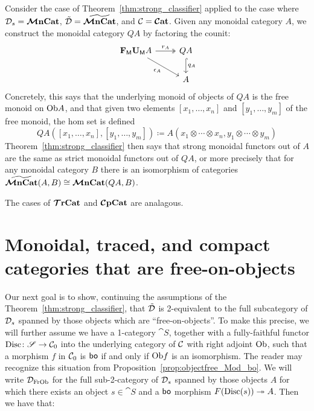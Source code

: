 \documentclass[11pt,oneside,article]{memoir}
\begin{document}
\begin{example}
   Consider the case of Theorem~\ref{thm:strong_classifier} applied to the case where
   $\mathcal{D}_s=\bm{\mathcal{M}}\mathbf{nCat}$, $\tilde{\mathcal{D}}=\widetilde{\bm{\mathcal{M}}\mathbf{nCat}}$, and $\mathcal{C}=\bm{\mathcal{C}}\mathbf{at}$. Given any monoidal category
   $A$, we construct the monoidal category $QA$ by factoring the counit:
   \begin{equation}
      \begin{tikzcd}
         \FM\UM A \ar[r,two heads,"r_A"] \ar[dr,"\epsilon_A"']
            & QA \ar[d,hook,"q_A"] \\
         & A
      \end{tikzcd}
   \end{equation}
   Concretely, this says that the underlying monoid of objects of $QA$ is the free monoid on
   $\mathrm{Ob} A$, and that given two elements $[x_1,\dots,x_n]$ and $[y_1,\dots,y_m]$ of the free monoid,
   the hom set is defined
   \begin{equation*}
      QA([x_1,\dots,x_n],[y_1,\dots,y_m])
         \coloneqq A(x_1\otimes\cdots\otimes x_n,y_1\otimes\cdots\otimes y_m)
   \end{equation*}
   Theorem~\ref{thm:strong_classifier} then says that strong monoidal functors out of $A$ are the
   same as strict monoidal functors out of $QA$, or more precisely that for any monoidal category
   $B$ there is an isomorphism of categories $\widetilde{\bm{\mathcal{M}}\mathbf{nCat}}(A,B)\cong\bm{\mathcal{M}}\mathbf{nCat}(QA,B)$.
   
   The cases of $\bm{\mathcal{T}}\mathbf{rCat}$ and $\bm{\mathcal{C}}\mathbf{pCat}$ are analagous.
\end{example}

\section{Monoidal, traced, and compact categories that are free-on-objects}

Our next goal is to show, continuing the assumptions of the Theorem~\ref{thm:strong_classifier}, that $\tilde{\mathcal{D}}$ is
2-equivalent to the full subcategory of $\mathcal{D}_s$ spanned by those objects which are
``free-on-objects''. To make this precise, we will further assume we have a 1-category $\cat{S}$,
together with a fully-faithful functor $\mathrm{Disc}\colon\mathscr{S}\to\mathcal{C}_0$ into the underlying
category of $\mathcal{C}$ with right adjoint $\mathrm{Ob}$, such that a morphism $f$ in $\mathcal{C}_0$ is $\mathsf{bo}$ if
and only if $\mathrm{Ob} f$ is an isomorphism. The reader may recognize this situation from Proposition~\ref{prop:objectfree_Mod_bo}. We will write $\mathcal{D}_{\mathrm{FrOb}}$ for the full sub-2-category of
$\mathcal{D}_s$ spanned by those objects $A$ for which there exists an object $s\in\cat{S}$ and a $\mathsf{bo}$
morphism $F(\mathrm{Disc}(s))\twoheadrightarrow A$. Then we have that:
\end{document}
